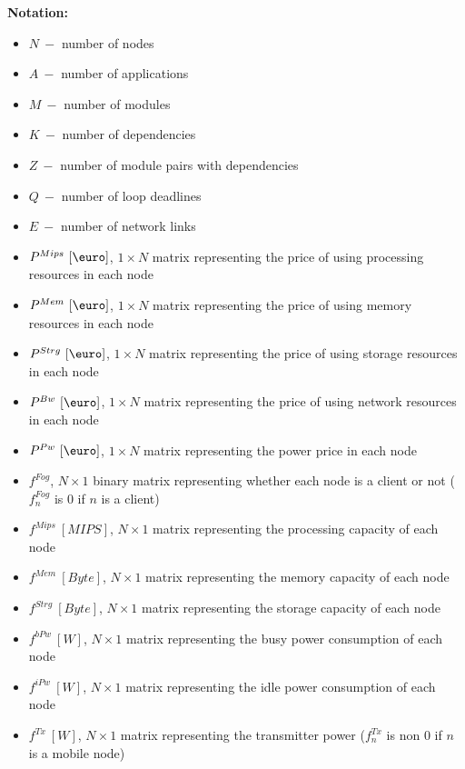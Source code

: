 \documentclass{article}
\begin{document}
\newcommand{\SubItem}[1]{
    {\setlength\itemindent{15pt} \item[-] #1}
}

\noindent\textbf{Notation:}
\begin{itemize}
	\item $N~-$ number of nodes
	\item $A~-$ number of applications
	\item $M~-$ number of modules
	\item $K~-$ number of dependencies
	\item $Z~-$ number of module pairs with dependencies
	\item $Q~-$ number of loop deadlines
	\item $E~-$ number of network links\\
	
	\item $P^{Mips}~[\mbox{\euro}]$, $1\times N$ matrix representing the price of using processing resources in each node
	\item $P^{Mem}~[\mbox{\euro}]$, $1\times N$ matrix representing the price of using memory resources in each node
	\item $P^{Strg}~[\mbox{\euro}]$, $1\times N$ matrix representing the price of using storage resources in each node
	\item $P^{Bw}~[\mbox{\euro}]$, $1\times N$ matrix representing the price of using network resources in each node
	\item $P^{Pw}~[\mbox{\euro}]$, $1\times N$ matrix representing the power price in each node\\
	
	\item $f^{Fog}$, $N\times 1$ binary matrix representing whether each node is a client or not ($f^{Fog}_n$ is 0 if $n$ is a client)
	\item $f^{Mips}~[MIPS]$, $N\times 1$ matrix representing the processing capacity of each node
	\item $f^{Mem}~[Byte]$, $N\times 1$ matrix representing the memory capacity of each node
	\item $f^{Strg}~[Byte]$, $N\times 1$ matrix representing the storage capacity of each node
	\item $f^{bPw}~[W]$, $N\times 1$ matrix representing the busy power consumption of each node
	\item $f^{iPw}~[W]$, $N\times 1$ matrix representing the idle power consumption of each node
	\item $f^{Tx}~[W]$, $N\times 1$ matrix representing the transmitter power ($f^{Tx}_n$ is non 0 if $n$ is a mobile node)\\
	

\end{itemize}
\end{document}
